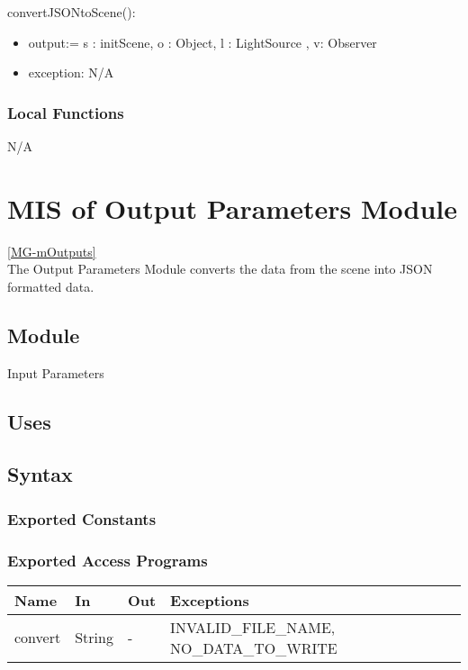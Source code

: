 \documentclass[12pt, titlepage]{article}
\begin{document}
\noindent convertJSONtoScene():
\begin{itemize}
	\item output:= s : initScene, o : Object, l : LightSource , v: Observer 
	\item exception: N/A
\end{itemize}

\subsubsection{Local Functions}
N/A

\newpage

\section{MIS of Output Parameters Module} \ref{MG-mOutputs} \\
The Output Parameters Module converts the data from the scene into JSON 
formatted data.

\subsection{Module}
Input Parameters

\subsection{Uses}

\subsection{Syntax}
\subsubsection{Exported Constants}

\subsubsection{Exported Access Programs}
\begin{center}
	\begin{tabular}{p{4cm} p{2cm} p{2cm} p{4cm}}
		\hline
		\textbf{Name} & \textbf{In} & \textbf{Out} & \textbf{Exceptions} \\
		\hline
		convert & String & - & INVALID\_FILE\_NAME, NO\_DATA\_TO\_WRITE\\
		\hline
	\end{tabular}
\end{center}
\end{document}
